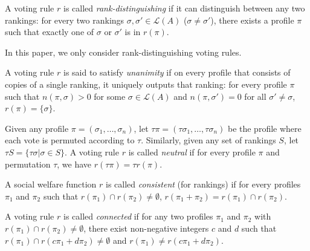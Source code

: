 \documentclass[10pt,letterpaper]{article}
\newcommand{\calL}{{\mathcal{L}}}
\newcommand{\rank}{{\calL(A)}}
\newenvironment{definition}[1][Definition]{\begin{trivlist}
\item[\hskip \labelsep {\bfseries #1}]}{\end{trivlist}}
\begin{document}
\begin{definition}[Rank-Distinguishability]
A voting rule $r$ is called \emph{rank-distinguishing} if it can distinguish between any two rankings: for every two rankings $\sigma, \sigma' \in \rank$ ($\sigma \neq \sigma'$), there exists a profile $\pi$ such that exactly one of $\sigma$ or $\sigma'$ is in $r(\pi)$. 
\end{definition}

In this paper, we only consider rank-distinguishing voting rules.


\begin{definition}[Unanimity]
A voting rule $r$ is said to satisfy \emph{unanimity} if on every profile that consists of copies of a single ranking, it uniquely outputs that ranking: for every profile $\pi$ such that $n(\pi,\sigma) > 0$ for some $\sigma \in \rank$ and $n(\pi,\sigma') = 0$ for all $\sigma' \neq \sigma$, $r(\pi) = \{\sigma\}$. 
\end{definition}

\begin{definition}[Neutrality]
Given any profile $\pi = (\sigma_1,\ldots,\sigma_n)$, let $\tau \pi = (\tau \sigma_1,\ldots,\tau \sigma_n)$ be the profile where each vote is permuted according to $\tau$. Similarly, given any set of rankings $S$, let $\tau S = \{\tau \sigma | \sigma \in S\}$. A voting rule $r$ is called \emph{neutral} if for every profile $\pi$ and permutation $\tau$, we have $r(\tau \pi) = \tau r(\pi)$. 
\end{definition}


\begin{definition}[Consistency] %
A social welfare function $r$ is called \emph{consistent} (for rankings) if for every profiles $\pi_1$ and $\pi_2$ such that $r(\pi_1) \cap r(\pi_2) \neq \emptyset$, $r(\pi_1+\pi_2) = r(\pi_1) \cap r(\pi_2)$. %
\end{definition}


\begin{definition}[Connectedness]
A voting rule $r$ is called \emph{connected} if for any two profiles $\pi_1$ and $\pi_2$ with $r(\pi_1) \cap r(\pi_2) \neq \emptyset$, there exist non-negative integers $c$ and $d$ such that $r(\pi_1) \cap r(c \pi_1 + d \pi_2) \neq \emptyset$ and $r(\pi_1) \neq r(c \pi_1 + d \pi_2)$. 
\end{definition}
\end{document}
